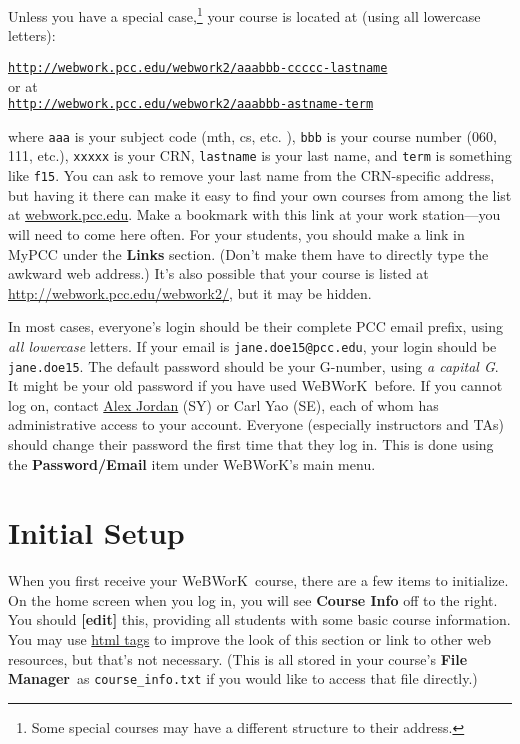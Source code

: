 \documentclass[12pt]{article}
\newcommand{\menu}[1]{\textbf{#1}}
\newcommand{\WW}{WeBWorK}
\newcommand{\FM}{\menu{File Manager}}
\begin{document}
Unless you have a special case,\footnote{Some special courses may have a different structure to their address.} your course is located at (using all lowercase letters): \begin{center} \href{http://webwork.pcc.edu/webwork2/}{\texttt{http://webwork.pcc.edu/webwork2/aaabbb-ccccc-lastname}}\\ or at\\ \href{http://webwork.pcc.edu/webwork2/}{\texttt{http://webwork.pcc.edu/webwork2/aaabbb-astname-term}} \end{center} where \texttt{aaa} is your subject code (mth, cs, etc.
), \texttt{bbb} is your course number (060, 111, etc.),  \texttt{xxxxx} is your CRN, \texttt{lastname} is your last name, and \texttt{term} is something like \texttt{f15}.
You can ask to remove your last name from the CRN-specific address, but having it there can make it easy to find your own courses from among the list at \url{webwork.pcc.edu}.
Make a bookmark with this link at your work station---you will need to come here often.
For your students, you should make a link in MyPCC under the \menu{Links} section.
(Don't make them have to directly type the awkward web address.) It's also possible that your course is listed at \href{http://webwork.pcc.edu/webwork2/}{http://webwork.pcc.edu/webwork2/}, but it may be hidden.

In most cases, everyone's login should be their complete PCC email prefix, using \emph{all lowercase} letters.
If your email is \texttt{jane.doe15@pcc.edu}, your login should be \texttt{jane.doe15}.
The default password should be your G-number, using \emph{a capital G}.
It might be your old password if you have used \WW\ before.
If you cannot log on, contact \href{mailto:alex.jordan@pcc.edu}{Alex Jordan} (SY) or Carl Yao (SE), each of whom has administrative access to your account.
Everyone (especially instructors and TAs) should change their password the first time that they log in.
This is done using the \menu{Password/Email} item under \WW's main menu.

\section{Initial Setup}
When you first receive your \WW\ course, there are a few items to initialize.
On the home screen when you log in, you will see \menu{Course Info} off to the right.
You should \menu{[edit]} this, providing all students with some basic course information.
You may use \href{http://en.wikipedia.org/wiki/HTML_element}{html tags} to improve the look of this section or link to other web resources, but that's not necessary.
(This is all stored in your course's \FM\  as \verb=course_info.txt= if you would like to access that file directly.)
\end{document}
